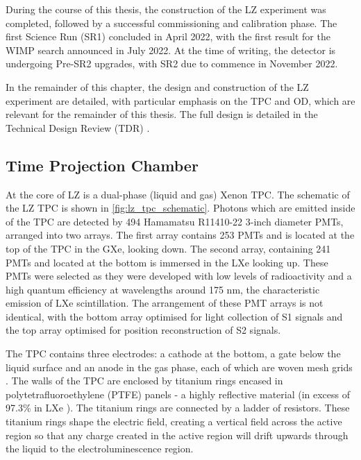 \par
During the course of this thesis, the construction of the LZ experiment was completed, followed by a successful commissioning and calibration phase.
The first Science Run (SR1) concluded in April 2022, with the first result for the WIMP search announced in July 2022.
At the time of writing, the detector is undergoing Pre-SR2 upgrades, with SR2 due to commence in November 2022.

\par
In the remainder of this chapter, the design and construction of the LZ experiment are detailed, with particular emphasis on the TPC and OD, which are relevant for the remainder of this thesis. 
The full design is detailed in the Technical Design Review (TDR) \cite{LZ_TechnicalDesignReview_ref}.

\subsection{Time Projection Chamber}
\label{sec:lz_tpc}
\par
At the core of LZ is a dual-phase (liquid and gas) Xenon TPC.
The schematic of the LZ TPC is shown in \autoref{fig:lz_tpc_schematic}.
Photons which are emitted inside of the TPC are detected by 494 Hamamatsu R11410-22 3-inch diameter PMTs, arranged into two arrays.
The first array contains 253 PMTs and is located at the top of the TPC in the GXe, looking down.
The second array, containing 241 PMTs and located at the bottom is immersed in the LXe looking up.
These PMTs were selected as they were developed with low levels of radioactivity and a high quantum efficiency at wavelengths around 175 nm, the characteristic emission of LXe scintillation.
The arrangement of these PMT arrays is not identical, with the bottom array optimised for light collection of S1 signals and the top array optimised for position reconstruction of S2 signals.
\par
The TPC contains three electrodes: a cathode at the bottom, a gate below the liquid surface and an anode in the gas phase, each of which are woven mesh grids \cite{lz_grids_ref}.
The walls of the TPC are enclosed by titanium rings encased in polytetrafluoroethylene (PTFE) panels - a highly reflective material (in excess of 97.3\% in LXe \cite{ptfe_lxe_reflectivity_ref}).
The titanium rings are connected by a ladder of resistors.
These titanium rings shape the electric field, creating a vertical field across the active region so that any charge created in the active region will drift upwards through the liquid to the electroluminescence region.
